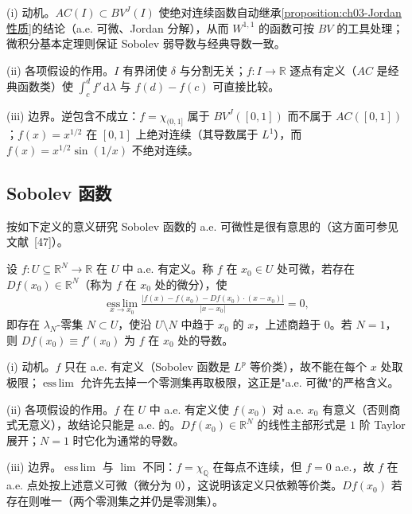 \documentclass[../../main.tex]{subfiles}%
\begin{document}
\begin{remark}\label{remark:ch03-AC蕴含动机}
(i) 动机。$AC(I)\subset BV^J(I)$ 使绝对连续函数自动继承\cref{proposition:ch03-Jordan性质}的结论（a.e. 可微、Jordan 分解），从而 $W^{1,1}$ 的函数可按 $BV$ 的工具处理；微积分基本定理则保证 Sobolev 弱导数与经典导数一致。

(ii) 各项假设的作用。$I$ 有界闭使 $\delta$ 与分割无关；$f:I\to\mathbb{R}$ 逐点有定义（$AC$ 是经典函数类）使 $\int_c^df'\,\mathrm{d}\lambda$ 与 $f(d)-f(c)$ 可直接比较。

(iii) 边界。逆包含不成立：$f=\chi_{(0,1]}$ 属于 $BV^J([0,1])$ 而不属于 $AC([0,1])$；$f(x)=x^{1/2}$ 在 $[0,1]$ 上绝对连续（其导数属于 $L^1$），而 $f(x)=x^{1/2}\sin(1/x)$ 不绝对连续。
\end{remark}

\subsection{Sobolev 函数}\label{subsection:ch03-Sobolev函数}

按如下定义的意义研究 Sobolev 函数的 a.e. 可微性是很有意思的（这方面可参见文献~[47]）。

\begin{definition}\label{definition:ch03-强可微}
设 $f:U\subseteq\mathbb{R}^N\to\mathbb{R}$ 在 $U$ 中 a.e. 有定义。称 $f$ 在 $x_0\in U$ 处可微，若存在 $Df(x_0)\in\mathbb{R}^N$（称为 $f$ 在 $x_0$ 处的微分），使
\begin{align*}
\operatorname*{ess\,lim}_{x\to x_0}\frac{|f(x)-f(x_0)-Df(x_0)\cdot(x-x_0)|}{|x-x_0|}=0,
\end{align*}
即存在 $\lambda_N$-零集 $N\subset U$，使沿 $U\setminus N$ 中趋于 $x_0$ 的 $x$，上述商趋于 $0$。若 $N=1$，则 $Df(x_0)\equiv f'(x_0)$ 为 $f$ 在 $x_0$ 处的导数。
\end{definition}

\begin{remark}\label{remark:ch03-强可微动机}
(i) 动机。$f$ 只在 a.e. 有定义（Sobolev 函数是 $L^p$ 等价类），故不能在每个 $x$ 处取极限；$\operatorname{ess\,lim}$ 允许先去掉一个零测集再取极限，这正是"a.e. 可微"的严格含义。

(ii) 各项假设的作用。$f$ 在 $U$ 中 a.e. 有定义使 $f(x_0)$ 对 a.e. $x_0$ 有意义（否则商式无意义），故结论只能是 a.e. 的。$Df(x_0)\in\mathbb{R}^N$ 的线性主部形式是 $1$ 阶 Taylor 展开；$N=1$ 时它化为通常的导数。

(iii) 边界。$\operatorname{ess\,lim}$ 与 $\lim$ 不同：$f=\chi_{\mathbb{Q}}$ 在每点不连续，但 $f=0$ a.e.，故 $f$ 在 a.e. 点处按上述意义可微（微分为 $0$），这说明该定义只依赖等价类。$Df(x_0)$ 若存在则唯一（两个零测集之并仍是零测集）。
\end{remark}
\end{document}
